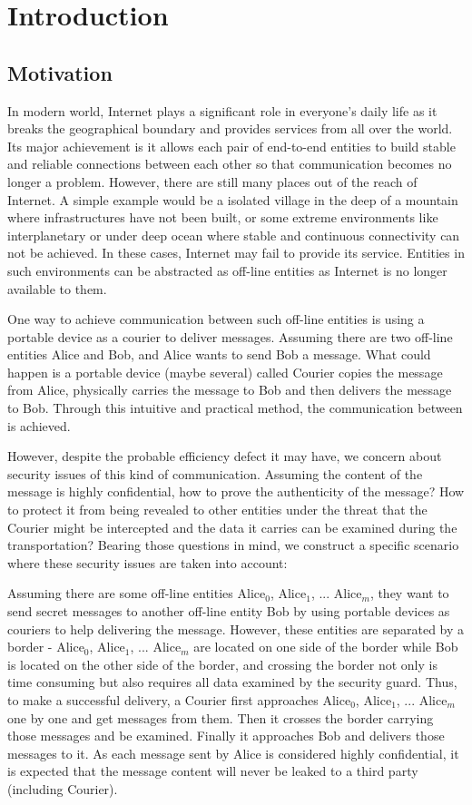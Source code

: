 \chapter{Introduction}
\section{Motivation}
In modern world, Internet plays a significant role in everyone's daily life as it breaks the geographical boundary and provides services from all over the world. Its major achievement is it allows each pair of end-to-end entities to build stable and reliable connections between each other so that communication becomes no longer a problem. However, there are still many places out of the reach of Internet. A simple example would be a isolated village in the deep of a mountain where infrastructures have not been built, or some extreme environments like interplanetary or under deep ocean where stable and continuous connectivity can not be achieved. In these cases, Internet may fail to provide its service. Entities in such environments can be abstracted as off-line entities as Internet is no longer available to them.

One way to achieve communication between such off-line entities is using a portable device as a courier to deliver messages. Assuming there are two off-line entities Alice and Bob, and Alice wants to send Bob a message. What could happen is a portable device (maybe several) called Courier copies the message from Alice, physically carries the message to Bob and then delivers the message to Bob. Through this intuitive and practical method, the communication between is achieved.

However, despite the probable efficiency defect it may have, we concern about security issues of this kind of communication. Assuming the content of the message is highly confidential, how to prove the authenticity of the message? How to protect it from being revealed to other entities under the threat that the Courier might be intercepted and the data it carries can be examined during the transportation? Bearing those questions in mind, we construct a specific scenario where these security issues are taken into account:

Assuming there are some off-line entities Alice$_0$, Alice$_1$, ... Alice$_m$, they want to send secret messages to another off-line entity Bob by using portable devices as couriers to help delivering the message. However, these entities are separated by a border - Alice$_0$, Alice$_1$, ... Alice$_m$ are located on one side of the border while Bob is located on the other side of the border, and crossing the border not only is time consuming but also requires all data examined by the security guard. Thus, to make a successful delivery, a Courier first approaches Alice$_0$, Alice$_1$, ... Alice$_m$ one by one and get messages from them. Then it crosses the border carrying those messages and be examined. Finally it approaches Bob and delivers those messages to it. As each message sent by Alice is considered highly confidential, it is expected that the message content will never be leaked to a third party (including Courier).

